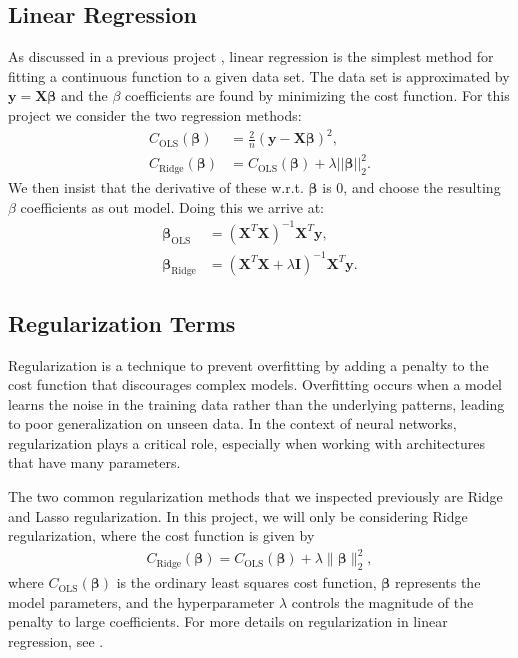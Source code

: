 \documentclass[%
reprint,s
amsmath,amssymb,
aps,
]{revtex4-2}
\begin{document}
\subsection{Linear Regression}
As discussed in a previous project \cite{project1}, linear regression is the simplest method for fitting a continuous function to a given data set. The data set is approximated by $\bm y=\bm X\bm\beta$ and the $\beta$ coefficients are found by minimizing the cost function. For this project we consider the two regression methods:
\begin{align}
	C_\text{OLS}(\bm\beta)&=\frac{2}{n}(\bm y-\bm X\bm\beta)^2,\\
	C_\text{Ridge}(\bm\beta)&=C_\text{OLS}(\bm\beta)+\lambda||\bm\beta||_2^2.
\end{align}
We then insist that the derivative of these w.r.t. $\bm\beta$ is $0$, and choose the resulting $\beta$ coefficients as out model. Doing this we arrive at:
\begin{align}
	\bm\beta_\text{OLS}&=(\bm X^T\bm X)^{-1}\bm X^T\bm y,\\
	\bm\beta_\text{Ridge}&=(\bm X^T\bm X+\lambda \bm I)^{-1}\bm X^T\bm y.
\end{align}

\subsection{Regularization Terms}
Regularization is a technique to prevent overfitting by adding a penalty to the cost function that discourages complex models. Overfitting occurs when a model learns the noise in the training data rather than the underlying patterns, leading to poor generalization on unseen data. In the context of neural networks, regularization plays a critical role, especially when working with architectures that have many parameters.

The two common regularization methods that we inspected previously are Ridge and Lasso regularization. In this project, we will only be considering Ridge regularization, where the cost function is given by
\begin{align}
	C_\text{Ridge}(\bm \beta)=C_\text{OLS}(\bm\beta)+\lambda\|\bm\beta\|_2^2,
\end{align}
where \(C_\text{OLS}(\bm\beta)\) is the ordinary least squares cost function, \(\bm\beta\) represents the model parameters, and the hyperparameter \(\lambda\) controls the magnitude of the penalty to large coefficients. For more details on regularization in linear regression, see \cite{project1}.
\end{document}
